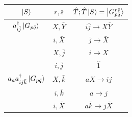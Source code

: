 \documentclass[./thesis.tex]{subfiles}
\begin{document}
\begin{table}
\begin{center}
\begin{minipage}[l]{0.5\textwidth}
\begin{tabular}{ c|c|c }
                \hline \hline \rule{0pt}{3ex}
                $\ket S$                                                                        &$ r, \bar s$   & $\hat T ; \hat T \ket S = \ket {G_{p \bar q}^{r \bar s}}$     \\
                \hline \hline \rule{0pt}{3ex}
                $a^\dagger_{i \bar j} \ket {G_{p \bar q}}$                          & $X, \bar Y$   &$i \bar j \rightarrow X \bar Y$                \\
                                                                                        & $i,\bar X$            &$\bar j \rightarrow \bar X$            \\
                                                                                        & $X,\bar j$    &$i \rightarrow X$              \\
                                                                                        & $i,\bar j$    &$\hat 1$                    \\
                                                                                        
                                                                                        
                \hline \rule{0pt}{3ex}
                $a_{a} a^\dagger_{ij \bar k} \ket {G_{p \bar q}}$           &$X,\bar k$             &$aX \rightarrow ij$            \\
                                                                                        &$i,\bar k$             &$a \rightarrow j$              \\
                                                                                        &$i,\bar X$             &$a \bar k \rightarrow j \bar X$                \\
                                                                                        

\end{tabular}
\end{minipage}
\end{center}
\end{table}
\end{document}
